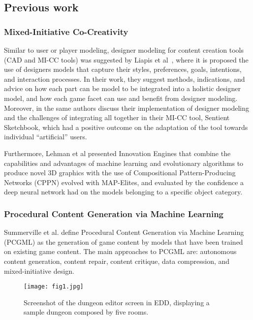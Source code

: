 \subsection{Previous work}

\subsubsection{Mixed-Initiative Co-Creativity}
Similar to user or player modeling, designer modeling for content creation tools (CAD and MI-CC tools) was suggested by Liapis et al~, where it is proposed the use of designers models that capture their styles, preferences, goals, intentions, and interaction processes. In their work, they suggest methods, indications, and advice on how each part can be model to be integrated into a holistic designer model, and how each game facet can use and benefit from designer modeling. Moreover, in  the same authors discuss their implementation of designer modeling and the challenges of integrating all together in their MI-CC tool, Sentient Sketchbook, which had a positive outcome on the adaptation of the tool towards individual “artificial” users.

Furthermore, Lehman et al  presented Innovation Engines that combine the capabilities and advantages of machine learning and evolutionary algorithms to produce novel 3D graphics with the use of Compositional Pattern-Producing Networks (CPPN) evolved with MAP-Elites, and evaluated by the confidence a deep neural network had on the models belonging to a specific object category.

\subsubsection{Procedural Content Generation via Machine Learning}
Summerville et al.  define Procedural Content Generation via Machine Learning (PCGML) as the generation of game content by models that have been trained on existing game content. The main approaches to PCGML are: autonomous content generation, content repair, content critique, data compression, and mixed-initiative design.

\begin{figure}
\texttt{[image: fig1.jpg]}
\caption{Screenshot of the dungeon editor screen in EDD, displaying a sample dungeon composed by five rooms.} \label{p5fig1}
\end{figure}

